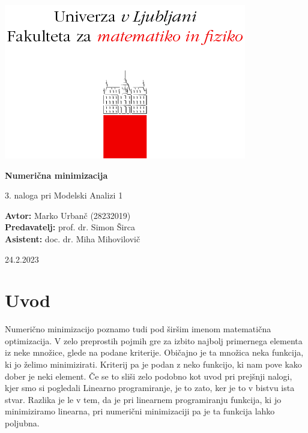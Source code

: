\documentclass[a4paper]{article}
\begin{document}
\begin{titlepage}
    \begin{center}
        \includegraphics[]{logo.png}
        \vspace*{3cm}
        
        \Huge
        \textbf{Numerična minimizacija}
        
        \vspace{0.5cm}
        \large
        3. naloga pri Modelski Analizi 1

        \vspace{4.5cm}
        
        \textbf{Avtor:} Marko Urbanč (28232019)\ \\
        \textbf{Predavatelj:} prof. dr. Simon Širca\ \\
        \textbf{Asistent:} doc. dr. Miha Mihovilovič\ \\
        
        \vspace{2.8cm}
        
        \large
        24.2.2023
    \end{center}
\end{titlepage}
\tableofcontents
\newpage
\section{Uvod}
Numerično minimizacijo poznamo tudi pod širšim imenom matematična optimizacija.
V zelo preprostih pojmih gre za izbito najbolj primernega elementa iz neke množice, 
glede na podane kriterije. Običajno je ta množica neka funkcija, ki jo želimo minimizirati.
Kriterij pa je podan z neko funkcijo, ki nam pove kako dober je neki element. Če se to sliši
zelo podobno kot uvod pri prejšnji nalogi, kjer smo si pogledali Linearno programiranje, je to
zato, ker je to v bistvu ista stvar. Razlika je le v tem, da je pri linearnem programiranju
funkcija, ki jo minimiziramo linearna, pri numerični minimizaciji pa je ta funkcija lahko
poljubna. \\
\end{document}
